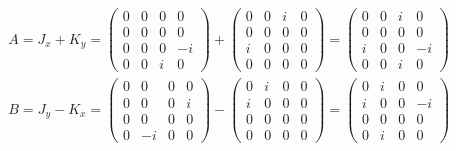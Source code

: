 \documentclass[11pt]{article}
\begin{document}
\section{ }
\begin{eqnarray}
    &&A=J_x+K_y=
    \begin{pmatrix}
        0 & 0 & 0 & 0\\
        0 & 0 & 0 & 0 \\
        0 & 0 & 0 & -i \\
        0 & 0 & i & 0
    \end{pmatrix}
    +
    \begin{pmatrix}
        0 & 0 & i & 0\\ 
        0 & 0 & 0 & 0 \\
        i & 0 & 0 & 0 \\
        0 & 0 & 0 & 0
    \end{pmatrix}
    =
    \begin{pmatrix}
        0 & 0 & i & 0\\ 
        0 & 0 & 0 & 0 \\
        i & 0 & 0 & -i \\
        0 & 0 & i & 0
    \end{pmatrix} \\
    &&B=J_y-K_x=
    \begin{pmatrix}
        0 & 0 & 0 & 0 \\
        0 & 0 & 0 & i \\
        0 & 0 & 0 & 0 \\
        0 & -i & 0 & 0 
      \end{pmatrix}
    -
    \begin{pmatrix}
        0 & i & 0 & 0\\ 
        i & 0 & 0 & 0 \\
        0 & 0 & 0 & 0 \\
        0 & 0 & 0 & 0 
    \end{pmatrix}
    =
    \begin{pmatrix}
        0 & i & 0 & 0 \\
        i & 0 & 0 & -i \\
        0 & 0 & 0 & 0 \\
        0 & i & 0 & 0 
    \end{pmatrix}
\end{eqnarray}
\end{document}
